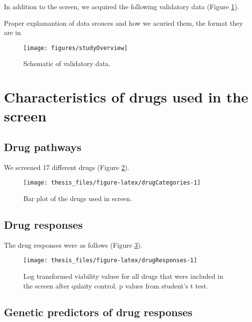 \documentclass[11pt, a4paper, twosided]{book}
\begin{document}
In addition to the screen, we acquired the following validatory data (Figure \ref{fig:additionalData}).

Proper explamantion of data srouces and how we acuried them, the format they are in


\begin{figure}

{\centering \texttt{[image: figures/studyOverview]} 

}

\caption{Schematic of validatory data.}\label{fig:additionalData}
\end{figure}
\hypertarget{characteristics-of-drugs-used-in-the-screen}{%
\section{Characteristics of drugs used in the screen}\label{characteristics-of-drugs-used-in-the-screen}}

\hypertarget{drug-pathways}{%
\subsection{Drug pathways}\label{drug-pathways}}

We screened 17 different drugs (Figure \ref{fig:drugCategories}).


\begin{figure}

{\centering \texttt{[image: thesis\_files/figure-latex/drugCategories-1]} 

}

\caption{Bar plot of the drugs used in screen.}\label{fig:drugCategories}
\end{figure}
\hypertarget{drug-responses}{%
\subsection{Drug responses}\label{drug-responses}}

The drug responses were as follows (Figure \ref{fig:drugResponses}).


\begin{figure}

{\centering \texttt{[image: thesis\_files/figure-latex/drugResponses-1]} 

}

\caption{Log transformed viability values for all drugs that were included in the screen after qulaity control. p values from student's t test.}\label{fig:drugResponses}
\end{figure}
\hypertarget{genetic-predictors-of-drug-responses}{%
\subsection{Genetic predictors of drug responses}\label{genetic-predictors-of-drug-responses}}
\end{document}
